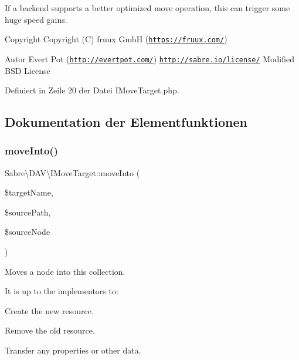 If a backend supports a better optimized move operation, this can trigger some huge speed gains.

\begin{DoxyCopyright}{Copyright}
Copyright (C) fruux GmbH (\href{https://fruux.com/}{\tt https\+://fruux.\+com/}) 
\end{DoxyCopyright}
\begin{DoxyAuthor}{Autor}
Evert Pot (\href{http://evertpot.com/}{\tt http\+://evertpot.\+com/})  \href{http://sabre.io/license/}{\tt http\+://sabre.\+io/license/} Modified B\+SD License 
\end{DoxyAuthor}


Definiert in Zeile 20 der Datei I\+Move\+Target.\+php.



\subsection{Dokumentation der Elementfunktionen}
\mbox{\label{interface_sabre_1_1_d_a_v_1_1_i_move_target_a65380c5b58a8a78bb4c9135567a50cdb}} 
\subsubsection{\texorpdfstring{move\+Into()}{moveInto()}}
{\footnotesize\ttfamily Sabre\textbackslash{}\+D\+A\+V\textbackslash{}\+I\+Move\+Target\+::move\+Into (\begin{DoxyParamCaption}\item[{}]{\$target\+Name,  }\item[{}]{\$source\+Path,  }\item[{\mbox{\hyperlink{interface_sabre_1_1_d_a_v_1_1_i_node}{I\+Node}}}]{\$source\+Node }\end{DoxyParamCaption})}

Moves a node into this collection.

It is up to the implementors to\+:
\begin{DoxyEnumerate}
\item Create the new resource.
\item Remove the old resource.
\item Transfer any properties or other data.
\end{DoxyEnumerate}

